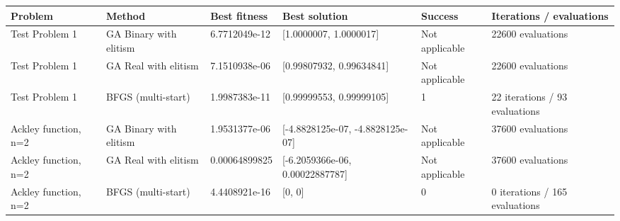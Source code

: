 \begin{tabular}{llllll}
\hline
Problem & Method & Best fitness & Best solution & Success & Iterations / evaluations \\
\hline
Test Problem 1 & GA Binary with elitism & 6.7712049e-12 & [1.0000007, 1.0000017] & Not applicable & 22600 evaluations \\
Test Problem 1 & GA Real with elitism & 7.1510938e-06 & [0.99807932, 0.99634841] & Not applicable & 22600 evaluations \\
Test Problem 1 & BFGS (multi-start) & 1.9987383e-11 & [0.99999553, 0.99999105] & 1 & 22 iterations / 93 evaluations \\
Ackley function, n=2 & GA Binary with elitism & 1.9531377e-06 & [-4.8828125e-07, -4.8828125e-07] & Not applicable & 37600 evaluations \\
Ackley function, n=2 & GA Real with elitism & 0.00064899825 & [-6.2059366e-06, 0.00022887787] & Not applicable & 37600 evaluations \\
Ackley function, n=2 & BFGS (multi-start) & 4.4408921e-16 & [0, 0] & 0 & 0 iterations / 165 evaluations \\
\hline
\end{tabular}
